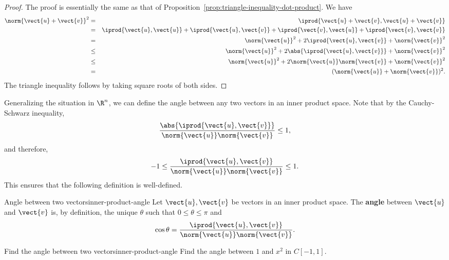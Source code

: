 \begin{proof}
  The proof is essentially the same as that of
  Proposition~\ref{prop:triangle-inequality-dot-product}. We have
  \begin{eqnarray*}
    \norm{\vect{u}+\vect{v}}^2
    &=& \iprod{\vect{u}+\vect{v},\vect{u}+\vect{v}} \\
    &=& \iprod{\vect{u},\vect{u}}+\iprod{\vect{u},\vect{v}}+\iprod{\vect{v},\vect{u}}+\iprod{\vect{v},\vect{v}} \\
    &=&\norm{\vect{u}}^2+2\iprod{\vect{u},\vect{v}}+\norm{\vect{v}}^2 \\
    &\leq& \norm{\vect{u}}^2+2\abs{\iprod{\vect{u},\vect{v}}}+\norm{\vect{v}}^2 \\
    &\leq& \norm{\vect{u}}^2+2\norm{\vect{u}}\norm{\vect{v}}+\norm{\vect{v}}^2 \\
    &=& (\norm{\vect{u}}+\norm{\vect{v}})^2.
  \end{eqnarray*}
  The triangle inequality follows by taking square roots of both sides.
\end{proof}

Generalizing the situation in $\R^n$, we can define the angle
between any two vectors in an inner product space. Note that by the
Cauchy-Schwarz inequality,
\begin{equation*}
  \frac{\abs{\iprod{\vect{u},\vect{v}}}}{\norm{\vect{u}}\norm{\vect{v}}}
  \leq 1,
\end{equation*}
and therefore,
\begin{equation*}
  -1 \leq \frac{\iprod{\vect{u},\vect{v}}}{\norm{\vect{u}}\norm{\vect{v}}}
  \leq 1.
\end{equation*}
This ensures that the following definition is well-defined.

\begin{definition}{Angle between two vectors}{inner-product-angle}
  Let $\vect{u},\vect{v}$ be vectors in an inner product space.
  The \textbf{angle}%
   between $\vect{u}$ and
  $\vect{v}$ is, by definition, the unique $\theta$ such that
  $0\leq\theta\leq\pi$ and
  \begin{equation*}
    \cos\theta = \frac{\iprod{\vect{u},\vect{v}}}{\norm{\vect{u}}\norm{\vect{v}}}.
  \end{equation*}
\end{definition}

\begin{example}{Find the angle between two vectors}{inner-product-angle}
  Find the angle between $1$ and $x^2$ in $C[-1,1]$.
\end{example}

